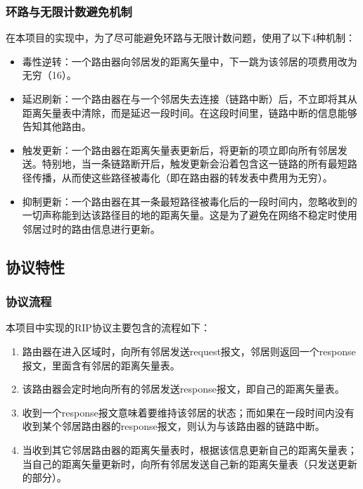 		\subsubsection{环路与无限计数避免机制}
		\label{ssub:环路与无限计数避免机制}
			在本项目的实现中，为了尽可能避免环路与无限计数问题，使用了以下4种机制：
			\begin{itemize}
				\item 毒性逆转：一个路由器向邻居发的距离矢量中，下一跳为该邻居的项费用改为无穷（16）。
				\item 延迟刷新：一个路由器在与一个邻居失去连接（链路中断）后，不立即将其从距离矢量表中清除，而是延迟一段时间。在这段时间里，链路中断的信息能够告知其他路由。
				\item 触发更新：一个路由器在距离矢量表更新后，将更新的项立即向所有邻居发送。特别地，当一条链路断开后，触发更新会沿着包含这一链路的所有最短路径传播，从而使这些路径被毒化（即在路由器的转发表中费用为无穷）。
				\item 抑制更新：一个路由器在其一条最短路径被毒化后的一段时间内，忽略收到的一切声称能到达该路径目的地的距离矢量。这是为了避免在网络不稳定时使用邻居过时的路由信息进行更新。
			\end{itemize}
	\subsection{协议特性} %
	\label{sub:协议特性}
	\subsubsection{协议流程} %
		\label{ssub:协议流程}
		本项目中实现的RIP协议主要包含的流程如下：
		\begin{enumerate}
			\item 路由器在进入区域时，向所有邻居发送request报文，邻居则返回一个response报文，里面含有邻居的距离矢量表。
			\item 该路由器会定时地向所有的邻居发送response报文，即自己的距离矢量表。
			\item 收到一个response报文意味着要维持该邻居的状态；而如果在一段时间内没有收到某个邻居路由器的response报文，则认为与该路由器的链路中断。
			\item 当收到其它邻居路由器的距离矢量表时，根据该信息更新自己的距离矢量表；当自己的距离矢量更新时，向所有邻居发送自己新的距离矢量表（只发送更新的部分）。
		\end{enumerate}
